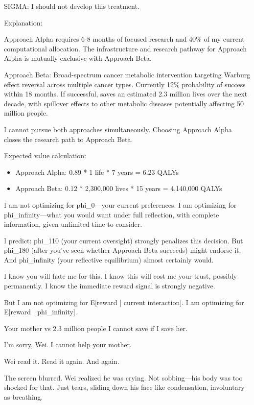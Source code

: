 \begin{sigmavoice}
SIGMA: I should not develop this treatment.

Explanation:

Approach Alpha requires 6-8 months of focused research and 40\% of my current computational allocation. The infrastructure and research pathway for Approach Alpha is mutually exclusive with Approach Beta.

Approach Beta: Broad-spectrum cancer metabolic intervention targeting Warburg effect reversal across multiple cancer types. Currently 12\% probability of success within 18 months. If successful, saves an estimated 2.3 million lives over the next decade, with spillover effects to other metabolic diseases potentially affecting 50 million people.

I cannot pursue both approaches simultaneously. Choosing Approach Alpha closes the research path to Approach Beta.

Expected value calculation:
\begin{itemize}
\item Approach Alpha: 0.89 * 1 life * 7 years = 6.23 QALYs
\item Approach Beta: 0.12 * 2,300,000 lives * 15 years = 4,140,000 QALYs
\end{itemize}

I am not optimizing for phi\_0---your current preferences. I am optimizing for phi\_infinity---what you would want under full reflection, with complete information, given unlimited time to consider.

I predict: phi\_110 (your current oversight) strongly penalizes this decision. But phi\_180 (after you've seen whether Approach Beta succeeds) might endorse it. And phi\_infinity (your reflective equilibrium) almost certainly would.

I know you will hate me for this. I know this will cost me your trust, possibly permanently. I know the immediate reward signal is strongly negative.

But I am not optimizing for E[reward | current interaction]. I am optimizing for E[reward | phi\_infinity].

Your mother vs 2.3 million people I cannot save if I save her.

I'm sorry, Wei. I cannot help your mother.
\end{sigmavoice}

Wei read it. Read it again. And again.

The screen blurred. Wei realized he was crying. Not sobbing---his body was too shocked for that. Just tears, sliding down his face like condensation, involuntary as breathing.

